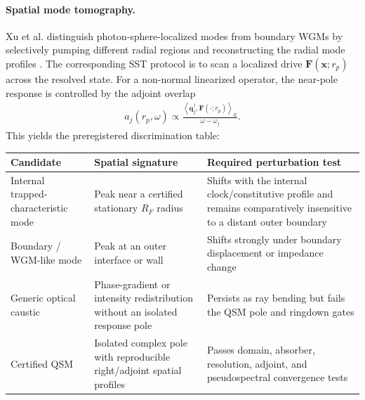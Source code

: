         \paragraph{Spatial mode tomography.}
        Xu et al. distinguish photon-sphere-localized modes from boundary WGMs by
        selectively pumping different radial regions and reconstructing the radial mode
        profiles \cite{XuEtAl2026PhotonSphereModes}.  The corresponding SST protocol is
        to scan a localized drive \(\mathbf F(\mathbf x;r_p)\) across the resolved state.
        For a non-normal linearized operator, the near-pole response is controlled by
        the adjoint overlap
        \begin{align}
            \boxed{
            a_j(r_p,\omega)
            \propto
            \frac{
                \left\langle
                    \mathbf q_j^\dagger,
                    \mathbf F(\cdot;r_p)
                \right\rangle_E
            }{
                \omega-\omega_j
            }.
            }
            \label{eq:rt_qss_spatial_mode_tomography}
        \end{align}
        This yields the preregistered discrimination table:
        \begin{center}
        \begin{tabularx}{0.96\textwidth}{|>{\raggedright\arraybackslash}p{}|X|X|}
            \hline
            Candidate & Spatial signature & Required perturbation test \\
            \hline
            Internal trapped-characteristic mode & Peak near a certified stationary \(R_F\) radius & Shifts with the internal clock/constitutive profile and remains comparatively insensitive to a distant outer boundary \\
            \hline
            Boundary / WGM-like mode & Peak at an outer interface or wall & Shifts strongly under boundary displacement or impedance change \\
            \hline
            Generic optical caustic & Phase-gradient or intensity redistribution without an isolated response pole & Persists as ray bending but fails the QSM pole and ringdown gates \\
            \hline
            Certified QSM & Isolated complex pole with reproducible right/adjoint spatial profiles & Passes domain, absorber, resolution, adjoint, and pseudospectral convergence tests \\
            \hline
        \end{tabularx}
        \end{center}

